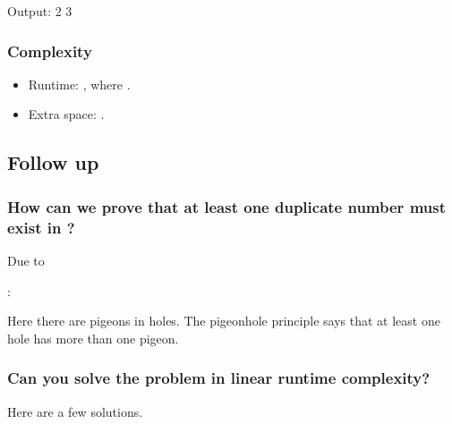 \documentclass[letterpaper,12pt,english]{book}
\begin{document}
\begin{sphinxVerbatim}[commandchars=\\\{\}]
Output:
2
3
\end{sphinxVerbatim}


\subsubsection{Complexity}
\label{\detokenize{Sorting/04_SORT_287_Find_the_Duplicate_Number:complexity}}\begin{itemize}
\item {} 
\sphinxAtStartPar
Runtime: , where .

\item {} 
\sphinxAtStartPar
Extra space: .

\end{itemize}


\subsection{Follow up}
\label{\detokenize{Sorting/04_SORT_287_Find_the_Duplicate_Number:follow-up}}

\subsubsection{How can we prove that at least one duplicate number must exist in ?}
\label{\detokenize{Sorting/04_SORT_287_Find_the_Duplicate_Number:how-can-we-prove-that-at-least-one-duplicate-number-must-exist-in-nums}}
\sphinxAtStartPar
Due to %
\begin{footnote}[82]\sphinxAtStartFootnote
{}
%
\end{footnote}:

\sphinxAtStartPar
Here there are  pigeons in  holes. The pigeonhole principle says that at least one hole has more than one pigeon.


\subsubsection{Can you solve the problem in linear runtime complexity?}
\label{\detokenize{Sorting/04_SORT_287_Find_the_Duplicate_Number:can-you-solve-the-problem-in-linear-runtime-complexity}}
\sphinxAtStartPar
Here are a few solutions.
\end{document}

